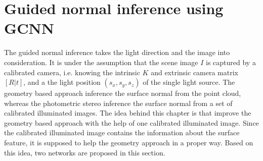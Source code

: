 \documentclass[border=15pt, multi, tikz]{article}
\begin{document}
\section{Guided normal inference using GCNN}
The guided normal inference takes the light direction and the image into consideration. It is under the assumption that the scene image $ I $ is captured by a calibrated camera, i.e. knowing the intrinsic $ K $ and extrinsic camera matrix $ [R|t] $, and a the light position $ (s_x, s_y, s_z) $ of the single light source. The geometry based approach inference the surface normal from the point cloud, whereas the photometric stereo inference the surface normal from a set of calibrated illuminated images. The idea behind this chapter is that improve the geometry based approach with the help of one calibrated illuminated image. Since the calibrated illuminated image contains the information about the surface feature, it is supposed to help the geometry approach in a proper way. Based on this idea, two networks are proposed in this section.
\end{document}
